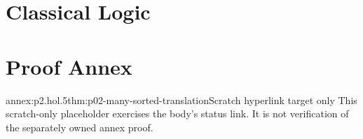 \documentclass[11pt]{book}
\begin{document}
\setcounter{part}{1}
\part{Classical Logic}
\label{def:p02-fol-satisfaction}

\appendix
\hbannexsetup
\part*{Proof Annex}
\begin{annexitem}{annex:p2.hol.5}{thm:p02-many-sorted-translation}{Scratch hyperlink target only}
This scratch-only placeholder exercises the body's status link.  It is not
verification of the separately owned annex proof.
\end{annexitem}
\printbibliography
\printindex
\end{document}
